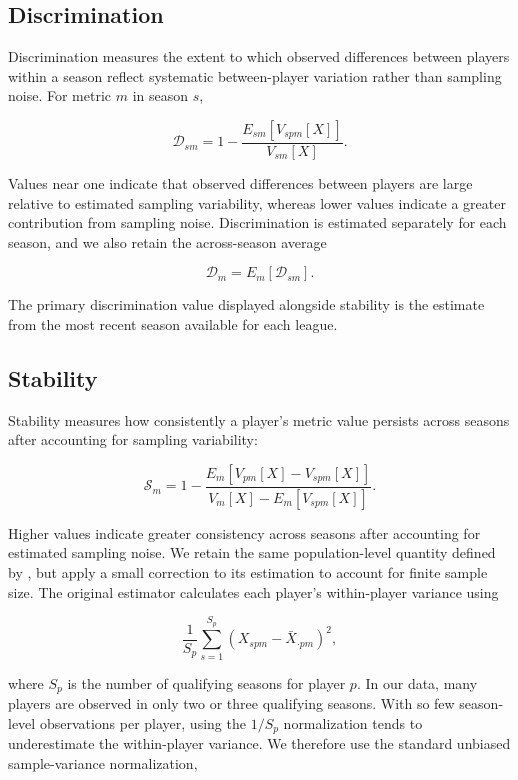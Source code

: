 \documentclass[
  12pt]{article}
\begin{document}
\subsection{Discrimination}\label{discrimination}

Discrimination measures the extent to which observed differences between
players within a season reflect systematic between-player variation
rather than sampling noise. For metric \(m\) in season \(s\),

\[
\mathcal{D}_{sm}
=
1-
\frac{
E_{sm}\left[V_{spm}[X]\right]
}{
V_{sm}[X]
}.
\]

Values near one indicate that observed differences between players are
large relative to estimated sampling variability, whereas lower values
indicate a greater contribution from sampling noise. Discrimination is
estimated separately for each season, and we also retain the
across-season average

\[
\mathcal{D}_{m}
=
E_m[\mathcal{D}_{sm}].
\]

The primary discrimination value displayed alongside stability is the
estimate from the most recent season available for each league.

\subsection{Stability}\label{stability}

Stability measures how consistently a player's metric value persists
across seasons after accounting for sampling variability:

\[
\mathcal{S}_{m}
=
1-
\frac{
E_m\left[V_{pm}[X]-V_{spm}[X]\right]
}{
V_m[X]-E_m\left[V_{spm}[X]\right]
}.
\]

Higher values indicate greater consistency across seasons after
accounting for estimated sampling noise. We retain the same
population-level quantity defined by \citet{franks_meta-analytics_2016},
but apply a small correction to its estimation to account for finite
sample size. The original estimator calculates each player's
within-player variance using

\[
\frac{1}{S_p}
\sum_{s=1}^{S_p}
\left(X_{spm}-\bar{X}_{\cdot pm}\right)^2,
\]

where \(S_p\) is the number of qualifying seasons for player \(p\). In
our data, many players are observed in only two or three qualifying
seasons. With so few season-level observations per player, using the
\(1/S_p\) normalization tends to underestimate the within-player
variance. We therefore use the standard unbiased sample-variance
normalization,
\end{document}
